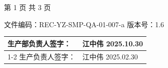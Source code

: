 \documentclass[UTF8,10pt,a4paper,fontset=fandol]{ctexart}
\newcommand{\fieldvalue}[1]{#1}
\newcommand{\handwritten}[1]{#1}
\begin{document}
\vfill
\begin{center}
第 1 页 共 3 页
\end{center}

\newpage

\begin{center}
文件编码：REC-YZ-SMP-QA-01-007-a \qquad 版本号：1.6
\end{center}

\begin{tabularx}{\textwidth}{|p{}|X|}
\hline
生产部负责人签字： &
\fieldvalue{\handwritten{江中伟 2025.10.30}} \\
\cline{1-2}
生产负责人签字： &
\fieldvalue{\handwritten{江中伟 2025.02.30}} \\
\hline
\end{tabularx}
\end{document}
